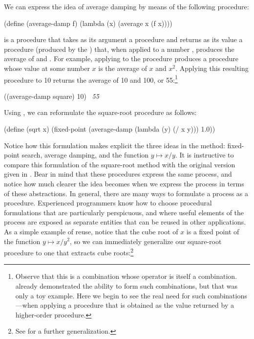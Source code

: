 We can express the idea of average damping by means of the following procedure:

\begin{codeBlock}
(define (average-damp f)
  (lambda (x) (average x (f x))))
\end{codeBlock}

\noindent
{} is a procedure that takes as its argument a procedure
 and returns as its value a procedure (produced by the )
that, when applied to a number , produces the average of  and
.  For example, applying  to the 
procedure produces a procedure whose value at some number \( x \) is the average
of \( x \) and \( x^2 \).  Applying this resulting procedure to 10 returns the
average of 10 and 100, or 55:\footnote{Observe that this is a combination whose
operator is itself a combination.   already demonstrated the
ability to form such combinations, but that was only a toy example.  Here we
begin to see the real need for such combinations---when applying a procedure
that is obtained as the value returned by a higher-order procedure.}

\begin{codeBlock}
((average-damp square) 10)
~\textit{55}~
\end{codeBlock}

\noindent
Using , we can reformulate the square-root procedure as
follows:

\begin{codeBlock}
(define (sqrt x)
  (fixed-point (average-damp (lambda (y) (/ x y)))
               1.0))
\end{codeBlock}

\noindent
Notice how this formulation makes explicit the three ideas in the method:
fixed-point search, average damping, and the function \( y \mapsto x / y \).
It is instructive to compare this formulation of the square-root method with
the original version given in .  Bear in mind that these
procedures express the same process, and notice how much clearer the idea
becomes when we express the process in terms of these abstractions.  In
general, there are many ways to formulate a process as a procedure.
Experienced programmers know how to choose procedural formulations that are
particularly perspicuous, and where useful elements of the process are exposed
as separate entities that can be reused in other applications.  As a simple
example of reuse, notice that the cube root of \( x \) is a fixed point of the
function \( y \mapsto x / y^2 \), so we can immediately generalize our
square-root procedure to one that extracts cube roots:\footnote{See
 for a further generalization.}

